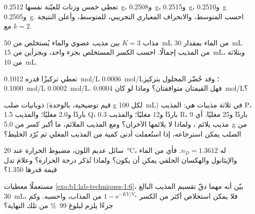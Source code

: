 \begin{exercise}[$\star\star$]\label{exo:b1:lab-techniques-1:5}
تعطي خمس وزنات للعيّنة نفسها \qty{0.2512}{g}، و\qty{0.2508}{g}،
و\qty{0.2515}{g}، و\qty{0.2510}{g} و\qty{0.2505}{g}. احسب المتوسط،
والانحراف المعياري التجريبي،  للمتوسط،
وأعلن النتيجة مع $k = 2$.
\end{exercise}

\begin{exercise}[$\star\star$]\label{exo:b1:lab-techniques-1:6}
مذاب  $K = 3$ بين مذيب عضوي
والماء يُستخلص من \qty{50}{mL} من الماء بمقدار \qty{30}{mL} من المذيب
إجمالًا. احسب الكسر المستخلص بجزء واحد، وبجزأين
من \qty{15}{mL}، وبثلاثة من \qty{10}{mL}.
\end{exercise}

\begin{exercise}[$\star\star$]\label{exo:b1:lab-techniques-1:7}
تعطي  تركيزًا قدره \qty{0.1012}{mol/L}  \qty{0.0006}{mol/L}؛ وقد حُضّر المحلول بتركيز
\qty{0.1000}{mol/L}  \qty{0.0002}{mol/L}. فهل
القيمتان متوافقتان؟ وماذا لو كان  
\qty{0.0004}{mol/L}؟
\end{exercise}

\begin{exercise}[$\star\star$]\label{exo:b1:lab-techniques-1:8}
ذوبانيات صلب (قيم توضيحية، بالوحدة \unit{g} لكل \qty{100}{mL}) في
ثلاثة مذيبات هي: المذيب P، 1.5 باردًا و2.0 مغليًا؛ والمذيب
Q، 0.3 باردًا و12 مغليًا؛ والمذيب R، 9 باردًا و25 مغليًا. أي
مذيب يلائم ، ولماذا لا يلائمها الآخران؟ ومع
المذيب الملائم، ما أكبر كسر من \qty{5.0}{g} من الصلب
يمكن استرجاعه، إذا استُعملت أدنى كمية من المذيب المغلي ثم
بُرّد الخليط؟
\end{exercise}

\begin{exercise}[$\star\star$]\label{exo:b1:lab-techniques-1:9}
سائل عديم اللون، مضبوط الحرارة عند \qty{20}{\celsius}، له
$n_D = 1.3612$. فأي من الماء والإيثانول والهكسان الحلقي يمكن أن يكون؟ ولماذا
تُذكر درجة الحرارة؟ وعلامَ تدل قيمة قدرها 1.350؟
\end{exercise}

\begin{exercise}[$\star\star\star$]\label{exo:b1:lab-techniques-1:10}
مستعملًا معطيات \cref{exo:b1:lab-techniques-1:6}، بيّن أنه مهما
دقّ تقسيم المذيب البالغ \qty{30}{mL}، فلا يمكن استخلاص أكثر من
الكسر $1 - \mathrm{e}^{-KV/V_a}$ من المذاب، واحسبه.
وكم جزءًا يلزم لبلوغ \qty{99}{\percent} من تلك النهاية؟
\end{exercise}

